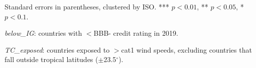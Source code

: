 \documentclass[10pt]{article}
\begin{document}
\begin{table}[h!]
\begin{threeparttable}
\begin{tabular}{lcccccc}
    \bottomrule
  \end{tabular}
  \begin{tablenotes}
    \footnotesize
    \item Standard errors in parentheses, clustered by ISO. *** $p<0.01$, ** $p<0.05$, * $p<0.1$.
    \item \textit{below\_IG}: countries with $<$BBB- credit rating in 2019.
    \item \textit{TC\_exposed}: countries exposed to $>$cat1 wind speeds, excluding countries that fall outside tropical latitudes ($\pm$23.5$^\circ$).
  \end{tablenotes}
  \end{threeparttable}
\end{table}
\end{document}
